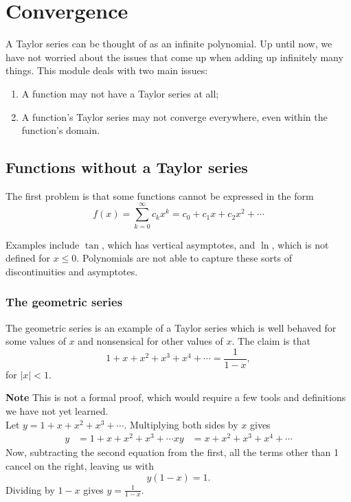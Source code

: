 \documentclass[twoside,openright,titlepage,a4paper]{book}
\begin{document}
\begin{sloppypar}
\section{Convergence} \label{ChFunctionsSecConvergence}

A Taylor series can be thought of as an infinite polynomial. Up until now, we have not worried about the issues that come up when adding up infinitely many things. This module deals with two main issues:
\begin{enumerate}
\item A function may not have a Taylor series at all;
\item A function's Taylor series may not converge everywhere, even within the function's domain.
\end{enumerate}

\subsection{Functions without a Taylor series}
The first problem is that some functions cannot be expressed in the form \[ f(x) = \sum_{k=0}^\infty c_k x^k = c_0 + c_1 x + c_2 x^2 + \dotsb \]

Examples include $\tan$, which has vertical asymptotes, and $\ln$, which is not defined for $x \leq 0$. Polynomials are not able to capture these sorts of discontinuities and asymptotes.

\subsubsection{The geometric series}

The geometric series is an example of a Taylor series which is well behaved for some values of $x$ and nonsensical for other values of $x$. The claim is that \begin{equation*} 1+x+x^2+x^3+x^4+\dotsb = \frac{1}{1-x}, \end{equation*} for $|x|<1$.

\begin{examplebox}
\textbf{Note} This is not a formal proof, which would require a few tools and definitions we have not yet learned.\\
Let $y = 1+x+x^2+x^3+\dotsb$. Multiplying both sides by $x$ gives
\begin{align*} 
y &= 1 + x + x^2 + x^3 + \dotsb 
x y &= x + x^2 + x^3+x^4 + \dotsb 
\end{align*}
Now, subtracting the second equation from the first, all the terms other than 1 cancel on the right, leaving us with \[ y(1-x) = 1. \]
Dividing by $1-x$ gives $y = \frac{1}{1-x}$.
\end{examplebox}


\end{sloppypar}
\end{document}
